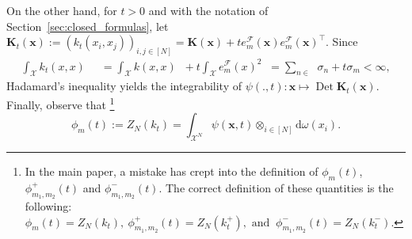 \documentclass[twoside,11pt]{book}
\numberwithin{theorem}{chapter}
\numberwithin{definition}{chapter}
\numberwithin{proposition}{chapter}
\numberwithin{corollary}{chapter}
\numberwithin{example}{chapter}
\numberwithin{lemma}{chapter}
\DeclareMathOperator{\Det}{Det}
\DeclareMathOperator{\Tran}{\intercal}
\DeclareMathOperator{\F}{\mathcal{F}}
\DeclareMathOperator{\X}{\mathcal{X}}
\DeclareMathOperator{\Mu}{\mathrm{d}\omega(x)}
\DeclareMathOperator{\Ns}{\mathbb{N}^{*}}
\begin{document}
On the other hand, for $t>0$ and with the notation of Section~\ref{sec:closed_formulas}, let $ \bm{K}_{t}(\bm{x}) := (k_{t}(x_{i},x_{j}))_{i,j \in [N]} = \bm{K}(\bm{x})+t e_{m}^{\mathcal{F}}(\bm{x})e_{m}^{\mathcal{F}}(\bm{x})^{\Tran}$.
Since
\begin{align}
\int_{\X} k_{t}(x,x) \Mu
& = \int_{\X} k(x,x) \Mu + t \int_{\X} e_{m}^{\F}(x)^{2} \Mu = \sum\limits_{n \in \Ns} \sigma_{n} + t \sigma_{m} < \infty,
\end{align}
Hadamard's inequality yields the integrability of
$
\psi(.,t): \bm{x} \mapsto \Det \bm{K}_{t}(\bm{x}).
$
Finally, observe that \footnote{In the main paper, a mistake has crept into the definition of $\phi_{m}(t)$, $\phi_{m_{1},m_{2}}^{+}(t)$ and $\phi_{m_{1},m_{2}}^{-}(t)$. The correct definition of these quantities is the following: $
\phi_{m}(t) = Z_{N}(k_{t}) , \: \phi_{m_{1},m_{2}}^{+}(t) = Z_{N}(k_{t}^{+}),  \text{ and }\: \phi_{m_{1},m_{2}}^{-}(t) = Z_{N}(k_{t}^{-}). $}
\begin{equation}
\phi_{m}(t) := Z_N(k_t) =  \int_{\X^{N}} \psi(\bm{x},t) \otimes_{i \in [N]} \mathrm{d}\omega(x_{i}).
\end{equation}
\end{document}
